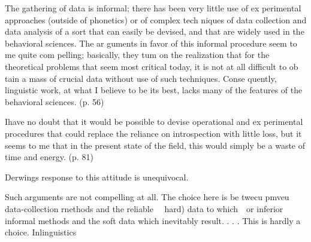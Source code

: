 \begin{styleStandard}
The gathering of data is informal; there has been very little use of ex\- perimental approaches (outside of phonetics) or of complex tech\- niques of data collection and data analysis of a sort that can easily be devised, and that are widely used in the behavioral sciences. The ar\- guments in favor of this informal procedure seem to me quite com\- pelling; basically, they tum on the realization that for the theoretical problems that seem most critical today, it is not at all difficult to ob\- tain a mass of crucial data without use of such techniques. Conse\- quently, linguistic work, at what I believe to be its best, lacks many of the features of the behavioral sciences. (p. 56)
\end{styleStandard}


\begin{styleStandard}
Ihave no doubt that it would be possible to devise operational and ex\- perimental procedures that could replace the reliance on introspection with little loss, but it seems to me that in the present state of the field, this would simply be a waste of time and energy. (p. 81)
\end{styleStandard}


\begin{styleStandard}
Derwing{\textquotesingle}s response to this attitude is unequivocal.
\end{styleStandard}


\begin{styleStandard}
Such {\textquotesingle}arguments{\textquotesingle} are not compelling at all. The choice here is be\- twecu pmveu data-collection rnethods and the reliable \ \ {\textquotesingle}hard{\textquotesingle}) data to which\ \ or inferior {\textquotesingle}informal{\textquotesingle} methods and the {\textquotesingle}soft{\textquotesingle} data which inevitably result. . . . This is hardly a choice. Inlinguistics
\end{styleStandard}


